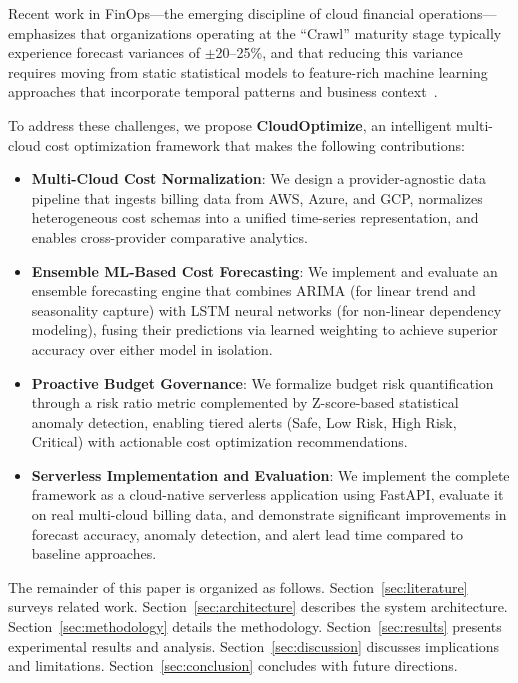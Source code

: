 \documentclass[conference]{IEEEtran}
\begin{document}
Recent work in FinOps---the emerging discipline of cloud financial operations---emphasizes that organizations operating at the ``Crawl'' maturity stage typically experience forecast variances of $\pm$20--25\%, and that reducing this variance requires moving from static statistical models to feature-rich machine learning approaches that incorporate temporal patterns and business context~\cite{finops2024}.

To address these challenges, we propose \textbf{CloudOptimize}, an intelligent multi-cloud cost optimization framework that makes the following contributions:

\begin{itemize}
    \item \textbf{Multi-Cloud Cost Normalization}: We design a provider-agnostic data pipeline that ingests billing data from AWS, Azure, and GCP, normalizes heterogeneous cost schemas into a unified time-series representation, and enables cross-provider comparative analytics.
    
    \item \textbf{Ensemble ML-Based Cost Forecasting}: We implement and evaluate an ensemble forecasting engine that combines ARIMA (for linear trend and seasonality capture) with LSTM neural networks (for non-linear dependency modeling), fusing their predictions via learned weighting to achieve superior accuracy over either model in isolation.
    
    \item \textbf{Proactive Budget Governance}: We formalize budget risk quantification through a risk ratio metric complemented by Z-score-based statistical anomaly detection, enabling tiered alerts (Safe, Low Risk, High Risk, Critical) with actionable cost optimization recommendations.
    
    \item \textbf{Serverless Implementation and Evaluation}: We implement the complete framework as a cloud-native serverless application using FastAPI, evaluate it on real multi-cloud billing data, and demonstrate significant improvements in forecast accuracy, anomaly detection, and alert lead time compared to baseline approaches.
\end{itemize}

The remainder of this paper is organized as follows. Section~\ref{sec:literature} surveys related work. Section~\ref{sec:architecture} describes the system architecture. Section~\ref{sec:methodology} details the methodology. Section~\ref{sec:results} presents experimental results and analysis. Section~\ref{sec:discussion} discusses implications and limitations. Section~\ref{sec:conclusion} concludes with future directions.
\end{document}
